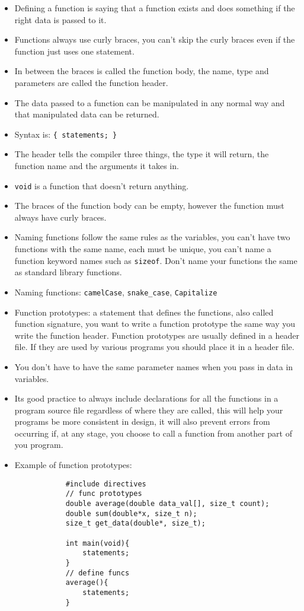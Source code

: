 \begin{itemize}
    \item Defining a function is saying that a function exists and does something if the right data is passed to it. 
    \item Functions always use curly braces, you can't skip the curly braces even if the function just uses one statement. 
    \item In between the braces is called the function body, the name, type and parameters are called the function header. 
    \item The data passed to a function can be manipulated in any normal way and that manipulated data can be returned. 
    \item Syntax is:   \verb|{ statements; }|
    \item The header tells the compiler three things, the type it will return, the function name and the arguments it takes in. 
    \item \verb|void| is a function that doesn't return anything. 
    \item The braces of the function body can be empty, however the function must always have curly braces. 
    \item Naming functions follow the same rules as the variables, you can't have two functions with the same name, each must be unique, you can't name a function keyword names such as \verb|sizeof|. Don't name your functions the same as standard library functions. 
    \item Naming functions: \verb|camelCase|, \verb|snake_case|, \verb|Capitalize|
    \item Function prototypes: a statement that defines the functions, also called function signature, you want to write a function prototype the same way you write the function header. Function prototypes are usually defined in a header file. If they are used by various programs you should place it in a header file. 
    \item You don't have to have the same parameter names when you pass in data in variables. 
    \item Its good practice to always include declarations for all the functions in a program source file regardless of where they are called, this will help your programs be more consistent in design, it will also prevent errors from occurring if, at any stage, you choose to call a function from another part of you program. 
    \item Example of function prototypes: 
        \begin{verbatim}
            #include directives 
            // func prototypes
            double average(double data_val[], size_t count);
            double sum(double*x, size_t n);
            size_t get_data(double*, size_t); 
            
            int main(void){
                statements;
            }
            // define funcs
            average(){
                statements; 
            }
        \end{verbatim}
\end{itemize}
